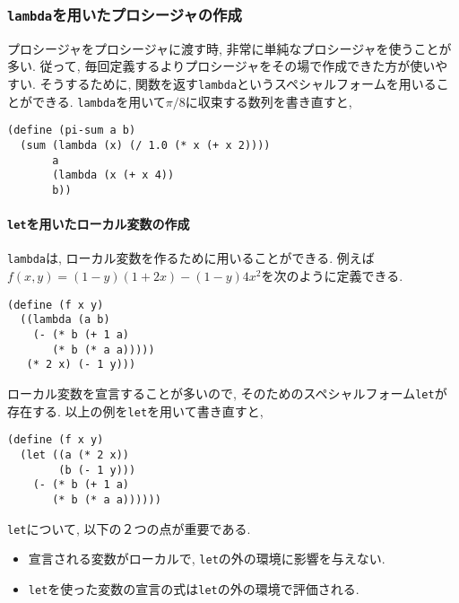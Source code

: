 \subsubsection{\lstinline{lambda}を用いたプロシージャの作成}
プロシージャをプロシージャに渡す時, 非常に単純なプロシージャを使うことが多い.
従って, 毎回定義するよりプロシージャをその場で作成できた方が使いやすい.
そうするために, 関数を返す\lstinline{lambda}というスペシャルフォームを用いることができる.
\lstinline{lambda}を用いて$\pi/8$に収束する数列を書き直すと,

\begin{lstlisting}[basicstyle=\footnotesize,title=一般的な和の関数と\lstinline{lambda}を用いた$\pi/8$に収束する数列]
(define (pi-sum a b)
  (sum (lambda (x) (/ 1.0 (* x (+ x 2))))
       a
       (lambda (x (+ x 4))
       b))
\end{lstlisting}

\paragraph{\lstinline{let}を用いたローカル変数の作成} \lstinline{lambda}は,
ローカル変数を作るために用いることができる. 例えば$f(x,y) = (1-y)(1+2x) - (1-y)4x^2$を次のように定義できる.

\begin{lstlisting}[basicstyle=\footnotesize]
(define (f x y)
  ((lambda (a b)
    (- (* b (+ 1 a)
       (* b (* a a)))))
   (* 2 x) (- 1 y)))
\end{lstlisting}

ローカル変数を宣言することが多いので, そのためのスペシャルフォーム\lstinline{let}が存在する.
以上の例を\lstinline{let}を用いて書き直すと,

\begin{lstlisting}[basicstyle=\footnotesize]
(define (f x y)
  (let ((a (* 2 x))
        (b (- 1 y)))
    (- (* b (+ 1 a)
       (* b (* a a))))))
\end{lstlisting}

\lstinline{let}について, 以下の２つの点が重要である.

\begin{itemize}
\item 宣言される変数がローカルで, \lstinline{let}の外の環境に影響を与えない.
\item \lstinline{let}を使った変数の宣言の式は\lstinline{let}の外の環境で評価される.
\end{itemize}
